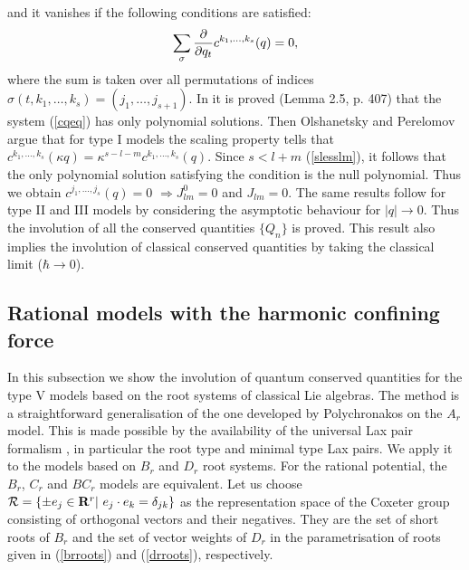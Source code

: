 \documentclass[a4paper,12pt]{article}
\begin{document}
and it vanishes if the following conditions are satisfied:
\begin{equation}
   \sum_{\sigma}{\partial\over{\partial q_t}}c^{k_1,\ldots,k_s}(q)
   =0,
\label{cqeq}
\end{equation}
where the sum is taken over all permutations of indices
\(\sigma(t,k_1,\ldots,k_s)=(j_1,\ldots,j_{s+1})\).
In \cite{Bere} it is proved (Lemma 2.5, p. 407) that the system
(\ref{cqeq}) has
only polynomial solutions.
Then Olshanetsky and Perelomov argue that for type I models the scaling
property tells that \(c^{k_1,\ldots,k_s}(\kappa
q)=\kappa^{s-l-m}c^{k_1,\ldots,k_s}(q)\). Since \(s<l+m\)
(\ref{slesslm}), it follows that the only polynomial solution  satisfying
the condition is the null polynomial. Thus we obtain
\(c^{j_1,\ldots,j_s}(q)=0\) \(\Rightarrow J_{lm}^0=0\) and \(J_{lm}=0\).
The same results follow for type II and III models by considering the
asymptotic behaviour for \(|q|\to0\). Thus the involution of all the
conserved quantities \(\{Q_n\}\) is proved. This result also implies the
involution of classical conserved quantities by taking the classical
limit (\(\hbar\to0\)).


\subsection{Rational  models with the harmonic confining force}
In this subsection we show the involution of quantum
conserved quantities  for the type V models  based on the root systems of
classical Lie algebras. The method is a straightforward generalisation of
the one developed by Polychronakos on the \(A_r\) model.
This is made possible by the availability of the universal Lax pair
formalism \cite{bcs2,bms}, in particular the root type and minimal
type Lax pairs.
We apply it to the models based on \(B_r\) and \(D_r\) root systems.
For the rational potential, the \(B_r\), \(C_r\) and \(BC_r\) models are
equivalent.
Let us choose \({\cal R}=\{\pm e_j\in{\bf R}^r|\ e_j\cdot
e_k=\delta_{jk}\}\) as the representation space of the Coxeter group
consisting of  orthogonal vectors and their negatives.
They are the set of short roots of \(B_r\) and the set of vector weights of
\(D_r\) in the parametrisation of roots given in (\ref{brroots}) and
(\ref{drroots}), respectively.
\end{document}
